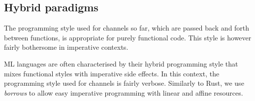 
\subsection{Hybrid paradigms}

The programming style used for channels so far, which are passed back
and forth between functions, is appropriate for purely functional code.
This style is however fairly bothersome in imperative contexts.

ML languages are often characterised by their hybrid programming style
that mixes functional styles with imperative side effects. In
this context, the programming style used for channels is fairly verbose.
Similarly to Rust, we use {\em borrows} to allow easy imperative
programming with linear and affine resources.


